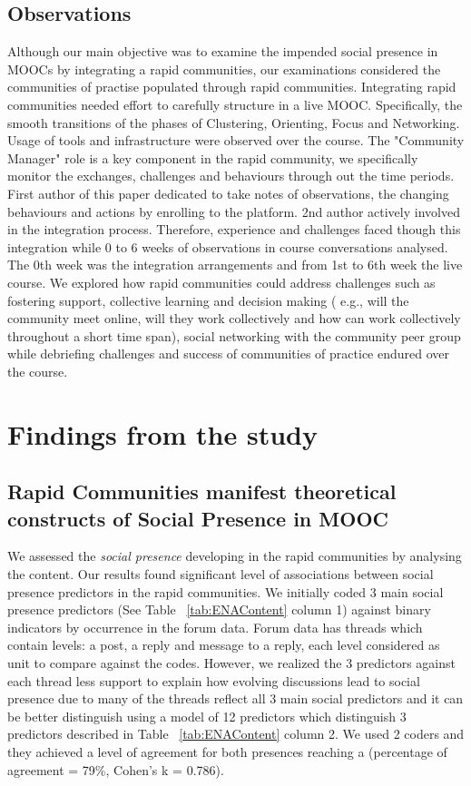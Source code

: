 \documentclass[manuscript,screen,review]{acmart}
\begin{document}
\subsection{Observations}
Although our main objective was to examine the impended social presence in MOOCs by integrating a rapid communities, our examinations considered the communities of practise populated through rapid communities. Integrating rapid communities needed effort to carefully structure in a live MOOC. Specifically, the smooth transitions of the phases of Clustering, Orienting, Focus and Networking. Usage of tools and infrastructure were observed over the course. The "Community Manager" role is a key component in the rapid community, we specifically monitor the exchanges, challenges and behaviours through out the time periods. First author of this paper dedicated to take notes of observations, the changing behaviours and actions by enrolling to the platform. 2nd author actively involved in the integration process. Therefore, experience and challenges faced though this integration while 0 to 6 weeks of observations in course  conversations analysed. The 0th week was the integration arrangements and from 1st to 6th week the live course. We explored how rapid communities could address challenges such as  fostering support, collective learning and decision making ( e.g., will the community meet online, will they work collectively and how can work collectively throughout a short time span), social networking with the community peer group while debriefing challenges and success of communities of practice endured over the course. 

\section{Findings from the study}

\subsection{Rapid Communities manifest theoretical constructs of Social Presence in MOOC}
We assessed the \textit{social presence} developing in the rapid communities by analysing the content. Our results found significant level of associations between social presence predictors in the rapid communities. We initially coded 3 main social presence predictors (See Table ~\ref{tab:ENAContent} column 1) against binary indicators by occurrence in the forum data. Forum data has threads which contain levels: a post, a reply and message to a reply, each level considered as unit to compare against the codes. However, we realized the 3 predictors against each thread less support to explain how evolving discussions lead to social presence due to many of the threads reflect all 3 main social predictors and it can be better distinguish using a model of 12 predictors which distinguish 3 predictors described in Table ~\ref{tab:ENAContent} column 2. We used 2 coders and they achieved a level of agreement for both presences reaching a (percentage of agreement = 79\%, Cohen's k = 0.786). 
\end{document}
